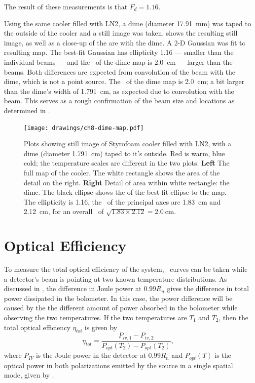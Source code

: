 The result of these measurements is that $F_d = 1.16$.


Using the same cooler filled with LN2, a dime (diameter \SI{17.91}{\mm}) was taped to the outside of the cooler and a still image was taken.
 shows the resulting still image, as well as a close-up of the are with the dime.
A 2-D Gaussian was fit to resulting map.
The best-fit Gaussian has ellipticity 1.16 --- smaller than the individual beams --- and the \FWHM\ of the dime map is \SI{2.0}{\cm} --- larger than the beams.
Both differences are expected from convolution of the beam with the dime, which is not a point source.
The \FWHM\ of the dime map is \SI{2.0}{\cm}; a bit larger than the dime's width of \SI{1.791}{\cm}, as expected due to convolution with the beam.
This serves as a rough confirmation of the beam size and locations as determined in .

\begin{figure}[th]
\centering
\texttt{[image: drawings/ch8-dime-map.pdf]}
\caption{
  Plots showing still image of Styrofoam cooler filled with LN2, with a dime (diameter \SI{1.791}{\cm}) taped to it's outside.
  Red is warm, blue cold; the temperature scales are different in the two plots.
  \textbf{Left} The full map of the cooler. The white rectangle shows the area of the detail on the right.
  \textbf{Right} Detail of area within white rectangle: the dime.
  The black ellipse shows the \FWHM of the best-fit ellipse to the map. The ellipticity is \num{1.16}, the \FWHM\ of the principal axes are \SI{1.83}{\cm} and \SI{2.12}{\cm}, for an overall \FWHM\ of $\sqrt{1.83 \times 2.12} = \SI{2.0}{\cm}$.
}
\label{fig:ch8-dime-map}
\end{figure}

\section{Optical Efficiency} \label{sec:ch8-opt-eff}

To measure the total optical efficiency of the system, \IV\ curves can be taken while a detector's beam is pointing at two known temperature distributions.
As discussed in , the difference in Joule power at $0.99 R_n$ gives the difference in total power dissipated in the bolometer.
In this case, the power difference will be caused by the the different amount of power absorbed in the bolometer while observing the two temperatures.
If the two temperatures are $T_1$ and $T_2$, then the total optical efficiency $\eta_{tot}$ is given by
\begin{equation}
  \eta_{tot} = \frac{P_{iv,1} - P_{iv,2}}{P_{opt}(T_2) - P_{opt}(T_2)},
\end{equation}
where $P_{IV}$ is the Joule power in the detector at $0.99 R_n$ and $P_{opt}(T)$ is the optical power in both polarizations emitted by the source in a single spatial mode, given by .

